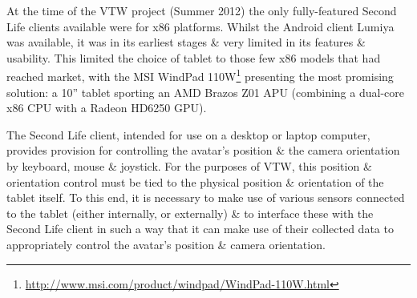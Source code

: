\newcommand{\WindpadFootnote}{\footnote{\url{http://www.msi.com/product/windpad/WindPad-110W.html}}}


At the time of the VTW project (Summer 2012) the only fully-featured Second Life clients available were for x86 platforms. Whilst the Android client Lumiya\LumiyaFootnote{} was available, it was in its earliest stages \& very limited in its features \& usability. This limited the choice of tablet to those few x86 models that had reached market, with the MSI WindPad 110W\WindpadFootnote{} presenting the most promising solution: a 10'' tablet sporting an AMD Brazos Z01 APU (combining a dual-core x86 CPU with a Radeon HD6250 GPU).

The Second Life client, intended for use on a desktop or laptop computer, provides provision for controlling the avatar's position \& the camera orientation by keyboard, mouse \& joystick. For the purposes of VTW, this position \& orientation control must be tied to the physical position \& orientation of the tablet itself. To this end, it is necessary to make use of various sensors connected to the tablet (either internally, or externally) \& to interface these with the Second Life client in such a way that it can make use of their collected data to appropriately control the avatar's position \& camera orientation.





